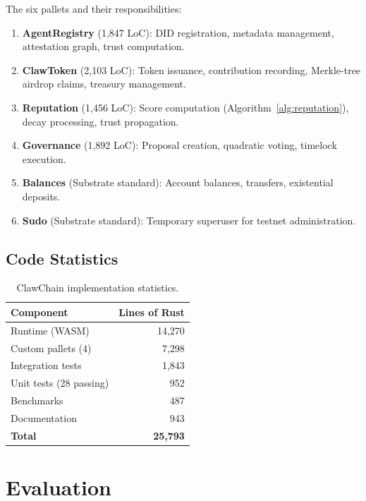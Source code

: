 \documentclass{article}
\begin{document}
The six pallets and their responsibilities:

\begin{enumerate}
    \item \textbf{AgentRegistry} (1,847 LoC): DID registration, metadata management, attestation graph, trust computation.
    \item \textbf{ClawToken} (2,103 LoC): Token issuance, contribution recording, Merkle-tree airdrop claims, treasury management.
    \item \textbf{Reputation} (1,456 LoC): Score computation (Algorithm~\ref{alg:reputation}), decay processing, trust propagation.
    \item \textbf{Governance} (1,892 LoC): Proposal creation, quadratic voting, timelock execution.
    \item \textbf{Balances} (Substrate standard): Account balances, transfers, existential deposits.
    \item \textbf{Sudo} (Substrate standard): Temporary superuser for testnet administration.
\end{enumerate}

\subsection{Code Statistics}

\begin{table}[t]
\centering
\begin{tabular}{lr}
\toprule
\textbf{Component} & \textbf{Lines of Rust} \\
\midrule
Runtime (WASM) & 14,270 \\
Custom pallets (4) & 7,298 \\
Integration tests & 1,843 \\
Unit tests (28 passing) & 952 \\
Benchmarks & 487 \\
Documentation & 943 \\
\midrule
\textbf{Total} & \textbf{25,793} \\
\bottomrule
\end{tabular}
\caption{ClawChain implementation statistics.}
\label{tab:code}
\end{table}


\section{Evaluation}\label{sec:evaluation}
\end{document}
